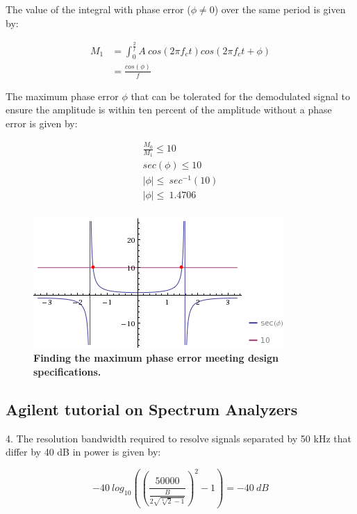 \documentclass[letterpaper,12pt]{article}
\begin{document}
The value of the integral with phase error ($\phi\neq0$) over the same period is
given by:

\begin{equation}
\begin{split}
M_{1} & = \int_{0}^{\frac{2}{f}}A\ cos(2\pi f_{c}t)cos(2\pi f_{c}t+\phi) \\
 & = \frac{cos(\phi)}{f}
\end{split}
\end{equation}

The maximum phase error $\phi$ that can be tolerated for the demodulated signal
to ensure the amplitude is within ten percent of the amplitude without a phase
error is given by:

\begin{equation}
\begin{split}
\frac{M_{0}}{M_{1}}\leq10 \\
sec(\phi)\leq10 \\
|\phi|\leq\ sec^{-1}(10) \\
|\phi|\leq\ 1.4706 \\
\end{split}
\end{equation}

\begin{figure}[hbtp]
\includegraphics[width=0.5\columnwidth]{prelab1-figure3}
\caption{
\label{fig:prelab1-figure3}
{\bf Finding the maximum phase error meeting design specifications.
}
}
\end{figure}

\pagebreak

\subsection*{Agilent tutorial on Spectrum Analyzers}

4. The resolution bandwidth required to resolve signals separated by 50 kHz that
differ by 40 dB in power is given by:

\begin{equation}
-40\ log_{10}\left(\left(\frac{50000}{\frac{B}{2\sqrt{\sqrt[4]{2}-1}}}\right)^2 - 1\right) = -40\ dB
\end{equation}
\end{document}
